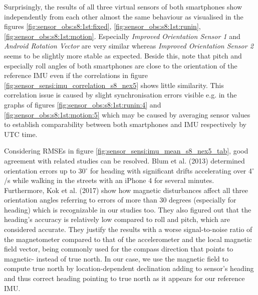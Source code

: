 \documentclass[review]{elsarticle}
\begin{document}
 
Surprisingly, the results of all three virtual sensors of both smartphones show independently from each other almost the same behaviour as visualised in the figures \ref{fig:sensor_obs:s8:1st:fixed}, \ref{fig:sensor_obs:s8:1st:runin}, \ref{fig:sensor_obs:s8:1st:motion}. Especially \textit{Improved Orientation Sensor 1} and \textit{Android Rotation Vector} are very similar whereas \textit{Improved Orientation Sensor 2} seems to be slightly more stable as expected.
Beside this, note that pitch and especially roll angles of both smartphones are close to the orientation of the reference \gls{IMU} even if the correlations in figure \ref{fig:sensor_sensi:imu_correlation_s8_nex5} shows little similarity. This correlation issue is caused by slight synchronisation errors visible e.g. in the graphs of figures \ref{fig:sensor_obs:s8:1st:runin:4} and \ref{fig:sensor_obs:s8:1st:motion:5} which may be caused by averaging sensor values to establish comparability between both smartphones and \gls{IMU} respectively by UTC time. 

Considering \glspl{RMSE} in figure \ref{fig:sensor_sensi:imu_mean_s8_nex5_tab}, good agreement with related studies can be resolved. Blum et al. (2013) \cite{Blum2013} determined orientation errors up to 30$^\circ$ for heading with significant drifts accelerating over 4$^\circ$/s while walking in the streets with an iPhone 4 for several minutes. Furthermore, Kok et al. (2017) \cite{Kok2017} show how magnetic disturbances affect all three orientation angles referring to errors of more than 30 degrees (especially for heading) which is  recognizable in our studies too. They also figured out that the heading's accuracy is relatively low compared to roll and pitch, which are considered accurate. They justify the results with a worse signal-to-noise ratio of the magnetometer compared to that of the accelerometer and the local magnetic field vector, being commonly used for the compass direction that points to magnetic- instead of true north. In our case, we use the magnetic field to compute true north by location-dependent declination adding to sensor's heading and thus correct heading pointing to true north as it appears for our reference \gls{IMU}. 
\end{document}
